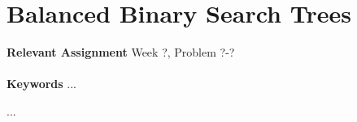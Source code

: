 
\chapter{Balanced Binary Search Trees}
\label{ch:balancedbinarysearchtrees}

\textbf{Relevant Assignment} Week ?, Problem ?-?\\\\
\textbf{Keywords} ...
\vspace{1in}

\noindent ...

